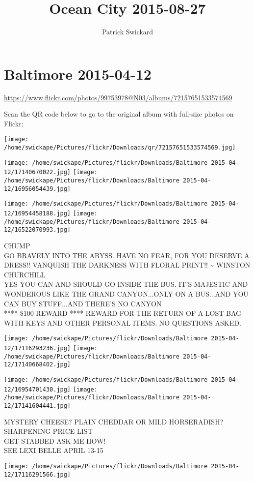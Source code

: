 \documentclass[10pt,letterpaper]{article}
\title{Ocean City 2015-08-27}
\author{Patrick Swickard}
\date{}
\begin{document}
\section*{Baltimore 2015-04-12}

\url{https://www.flickr.com/photos/99753978@N03/albums/72157651533574569}

Scan the QR code below to go to the original album with full-size photos on Flickr:

\texttt{[image: /home/swickape/Pictures/flickr/Downloads/qr/72157651533574569.jpg]}
\pagebreak

\texttt{[image: /home/swickape/Pictures/flickr/Downloads/Baltimore 2015-04-12/17140670022.jpg]}
\texttt{[image: /home/swickape/Pictures/flickr/Downloads/Baltimore 2015-04-12/16956054439.jpg]}

\texttt{[image: /home/swickape/Pictures/flickr/Downloads/Baltimore 2015-04-12/16954458188.jpg]}
\texttt{[image: /home/swickape/Pictures/flickr/Downloads/Baltimore 2015-04-12/16522070993.jpg]}

CHUMP\\
GO BRAVELY INTO THE ABYSS.  HAVE NO FEAR, FOR YOU DESERVE A DRESS!!  VANQUISH THE DARKNESS WITH FLORAL PRINT!!  \textasciitilde{} WINSTON CHURCHILL\\
YES YOU CAN AND SHOULD GO INSIDE THE BUS.  IT'S MAJESTIC AND WONDEROUS LIKE THE GRAND CANYON...ONLY ON A BUS...AND YOU CAN BUY STUFF...AND THERE'S NO CANYON\\
**** \$100 REWARD **** REWARD FOR THE RETURN OF A LOST BAG WITH KEYS AND OTHER PERSONAL ITEMS.  NO QUESTIONS ASKED.
\pagebreak

\texttt{[image: /home/swickape/Pictures/flickr/Downloads/Baltimore 2015-04-12/17116293236.jpg]}
\texttt{[image: /home/swickape/Pictures/flickr/Downloads/Baltimore 2015-04-12/17140668402.jpg]}

\texttt{[image: /home/swickape/Pictures/flickr/Downloads/Baltimore 2015-04-12/16954701430.jpg]}
\texttt{[image: /home/swickape/Pictures/flickr/Downloads/Baltimore 2015-04-12/17141604441.jpg]}

MYSTERY CHEESE?  PLAIN CHEDDAR OR MILD HORSERADISH?\\
SHARPENING PRICE LIST\\
GET STABBED ASK ME HOW!\\
SEE LEXI BELLE APRIL 13{-}15
\pagebreak

\texttt{[image: /home/swickape/Pictures/flickr/Downloads/Baltimore 2015-04-12/17116291566.jpg]}
\end{document}
